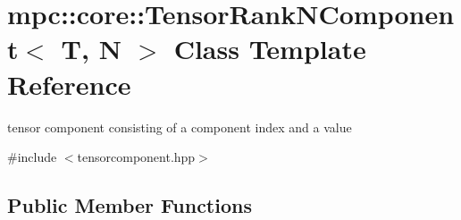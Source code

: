 \hypertarget{classmpc_1_1core_1_1_tensor_rank_n_component}{}\section{mpc\+:\+:core\+:\+:Tensor\+Rank\+N\+Component$<$ T, N $>$ Class Template Reference}
\label{classmpc_1_1core_1_1_tensor_rank_n_component}


tensor component consisting of a component index and a value  




{\ttfamily \#include $<$tensorcomponent.\+hpp$>$}

\subsection*{Public Member Functions}
